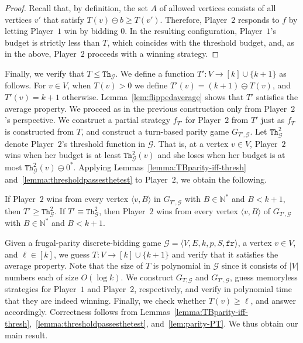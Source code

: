 \documentclass{article}\providecommand{\nequiv}{\not\equiv}\usepackage[a4paper,margin=20mm]{geometry}
\newcommand{\PO}{Player~$1$\xspace}
\newcommand{\PT}{Player~$2$\xspace}
\newcommand{\G}{{\mathcal G}}
\newcommand{\fr}{\texttt{fr}}
\newcommand{\Natstr}{\mathbb{N}^*}
\newcommand{\thresh}{\texttt{Th}\xspace}
\newcommand{\zug}[1]{\langle #1  \rangle}
\newcommand{\stam}[1]{}
\renewcommand{\set}[1]{\{ #1  \}}
\newcommand{\predb}[1]{#1 \ominus 0^*\xspace}
\begin{document}
\begin{proof}
Recall that, by definition, the set \(A\) of allowed vertices consists of all vertices \(v'\) that satisfy \(T(v) \ominus b \geq T(v')\). 
Therefore, \PT responds to \(f\) by letting \PO win by bidding \(0\). 
In the resulting configuration, \PO's budget is strictly less than $T$, which coincides with the threshold budget, and, as in the above, \PT proceeds with a winning strategy. 
\stam{
We distinguish three cases:
\begin{itemize}
\item $f$ overbids, namely $b_1 > b$,
\item $f$ underbids, namely $b_1 < b$, and
\item $f$ does not choose an allowed vertex, namely $b_1 = b$ and $v_1 \notin A$. 
\end{itemize}
}
\end{proof} 

Finally, we verify that \(T \leq \thresh_{\G}\). We define a function \(T': V \rightarrow [k] \cup \set{k+1}\) as follows. For \(v \in V\), when $T(v) > 0$ we define $T'(v) = (k+1) \ominus T(v)$, and $T'(v) = k+1$ otherwise. Lemma~\ref{lem:flippedaverage} shows that \(T'\) satisfies the average property.
We proceed as in the previous construction only from \PT's perspective. 
We construct a partial strategy $f_{T'}$ for \PT from $T'$ just as $f_T$ is constructed from $T$, and construct a turn-based parity game $G_{T', \G}$. Let \(\thresh_{\G}^2\) denote \PT's threshold function in \(\G\). That is, at a vertex $v \in V$, \PT wins when her budget is at least $\thresh_\G^2(v)$ and she loses when her budget is at most $\predb{\thresh_\G^2(v)}$. %
Applying Lemmas~\ref{lemma:TBparity-iff-thresh} and~\ref{lemma:thresholdpassesthetest} to \PT, we obtain the following.

\begin{lemma}
\label{lem:parity-PT}
    If \PT wins from every vertex $\zug{v, B}$ in $G_{T', \G}$ with $B \in \Natstr$ and $B < k+1$, then $T' \geq \thresh^2_{\G}$.
    If $T' \equiv \thresh^2_{\G}$, then \PT wins from every vertex $\zug{v, B}$ of $G_{T', \G}$ with $B \in \Natstr$ and $B < k+1$. 
\end{lemma}


Given a frugal-parity discrete-bidding game $\G = \zug{V, E, k, p, S, \fr}$, a vertex $v \in V$, and $\ell \in [k]$, we guess $T: V \rightarrow [k] \cup \set{k+1}$ and verify that it satisfies the average property. Note that the size of $T$ is polynomial in $\G$ since it consists of $|V|$ numbers each of size $O(\log k)$. We construct $G_{T, \G}$ and $G_{T', \G}$, guess memoryless strategies for \PO and \PT, respectively, and verify in polynomial time that they are indeed winning.  Finally, we check whether $T(v) \geq \ell$, and answer accordingly. Correctness follows from Lemmas~\ref{lemma:TBparity-iff-thresh},~\ref{lemma:thresholdpassesthetest}, and~\ref{lem:parity-PT}. We thus obtain our main result.
\end{document}
